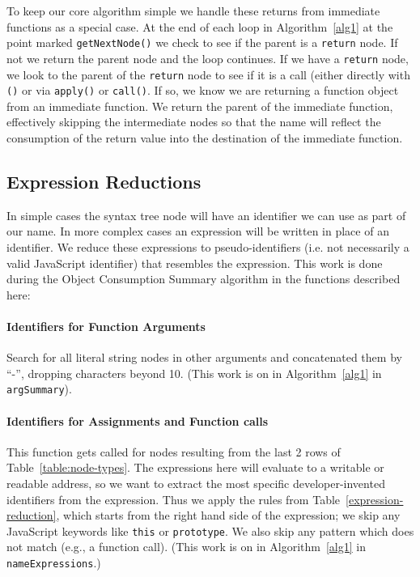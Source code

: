 \documentclass[10pt, preprint]{sigplanconf}
\begin{document}
To keep our core algorithm simple we handle these returns from immediate functions as a special case. At the end of each loop in Algorithm~\ref{alg1} at the point marked \verb|getNextNode()| we check to see if the parent is a \verb|return| node.  If not we return the parent node and the loop continues. If we have a \verb|return| node, we look to the parent of the \verb|return| node to see if it is a call (either directly with \verb|()| or via \verb|apply()| or \verb|call()|. If so, we know we are returning a function object from an immediate function.  We return the parent of the immediate function, effectively skipping the intermediate nodes so that the name will reflect the consumption of the return value into the destination of the immediate function.

\subsection{Expression Reductions}
\label{sec:general-element-naming}

In simple cases the syntax tree node will have an identifier we can use as part of our name. In more complex cases an expression will be written in place of an identifier. We reduce these expressions to pseudo-identifiers (i.e. not necessarily a valid JavaScript identifier) that resembles the expression. This work is done during the Object Consumption Summary algorithm in the functions described here:
\paragraph{Identifiers for Function Arguments} Search for all literal string nodes in other arguments and concatenated them by ``-'', dropping  characters beyond 10.  
 (This work is on in Algorithm~\ref{alg1} in \verb|argSummary|).
\paragraph{Identifiers for Assignments and Function calls} This function gets called for nodes resulting from the last 2 rows of Table~\ref{table:node-types}. The expressions here will evaluate to a writable or readable address, so we want to extract the most specific developer-invented identifiers from the expression. Thus we apply the rules from Table~\ref{expression-reduction}, which starts from the right hand side of the expression; we skip any JavaScript keywords like \texttt{this} or \texttt{prototype}. We also skip any pattern which does not match (e.g., a function call). (This work is on in Algorithm~\ref{alg1} in \verb|nameExpressions|.)
\end{document}
